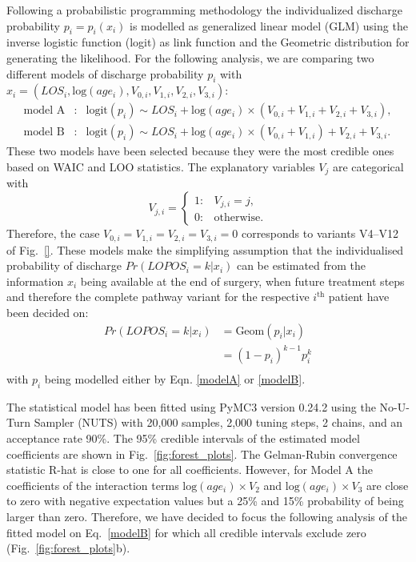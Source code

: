 \documentclass{elsarticle}
\begin{document}
Following a probabilistic programming methodology the individualized discharge probability $p_i = p_i(x_i)$ is modelled as generalized linear model (GLM) using the inverse logistic function (logit) as link function and the Geometric distribution for generating the likelihood. 
For the following analysis, we are comparing two different models of discharge probability $p_i$ with $x_i = (LOS_i, \text{log}(age_i), V_{0,i}, V_{1, i}, V_{2, i}, V_{3, i})$: 
\begin{eqnarray}
\label{modelA}\text{model A}&:& \text{logit}(p_i) \sim LOS_i + \text{log}(age_i) \times (V_{0,i} + V_{1,i} + V_{2,i} + V_{3,i}),\\
\label{modelB}\text{model B}&:& \text{logit}(p_i) \sim LOS_i + \text{log}(age_i) \times (V_{0,i} + V_{1,i}) + V_{2,i} + V_{3,i}. 
\end{eqnarray}
These two models have been selected because they were the most credible ones based on WAIC and LOO statistics. The explanatory variables $V_{j}$ are categorical with 
\begin{equation}
V_{j,i} = \begin{cases}
	1: & V_{j,i} = j,\\
        0: & \text{otherwise}.
\end{cases}
\end{equation}
Therefore, the case $V_{0,i}=V_{1,i}=V_{2,i}=V_{3,i}=0$ corresponds to variants V4--V12 of Fig.~\ref{}.
These models make the simplifying assumption that the individualised probability of discharge $Pr(LOPOS_i=k|x_i)$ can be estimated from the information $x_i$ being available at the end of surgery, when future treatment steps and therefore the complete pathway variant for the respective $i^\text{th}$ patient have been decided on:
\begin{equation}
\begin{split}
Pr(LOPOS_i=k|x_i) & = \text{Geom}(p_i|x_i) \\
                  & = (1-p_i)^{k-1}p_i^{k} \\
\end{split}
\end{equation}
with $p_i$ being modelled either by Eqn. \eqref{modelA} or \eqref{modelB}.

The statistical model has been fitted using PyMC3 \citep{Salvatier2016_PyMC3} version 0.24.2 using the No-U-Turn Sampler (NUTS) with 20,000 samples, 2,000 tuning steps, 2 chains, and an acceptance rate 90\%. The 95\% credible intervals of the estimated model coefficients are shown in Fig.~\ref{fig:forest_plots}. The Gelman-Rubin convergence statistic R-hat is close to one for all coefficients. 
However, for Model A the coefficients of the interaction terms $\text{log}(age_i)\times V_2$ and $\text{log}(age_i)\times V_3$ are close to zero with negative expectation values but a 25\% and 15\% probability of being larger than zero. 
Therefore, we have decided to focus the following analysis of the fitted model on Eq.~\ref{modelB} for which all credible intervals exclude zero (Fig.~\ref{fig:forest_plots}b).
\end{document}
